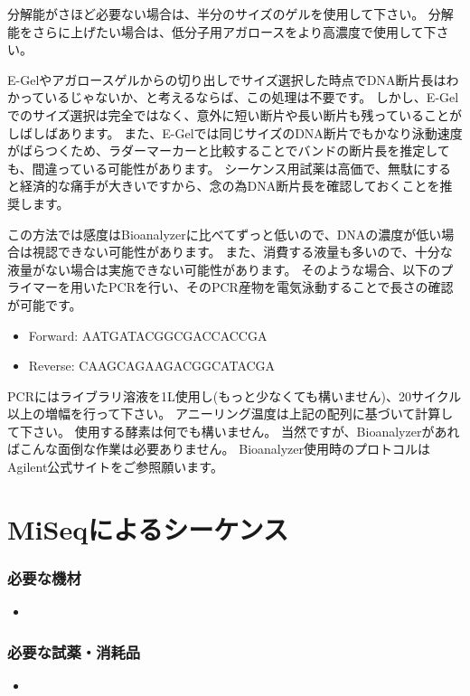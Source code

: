\documentclass[titlepage,10pt,a4paper,uplatex]{jsbook}
\begin{document}
分解能がさほど必要ない場合は、半分のサイズのゲルを使用して下さい。
分解能をさらに上げたい場合は、低分子用アガロースをより高濃度で使用して下さい。

E-Gelやアガロースゲルからの切り出しでサイズ選択した時点でDNA断片長はわかっているじゃないか、と考えるならば、この処理は不要です。
しかし、E-Gelでのサイズ選択は完全ではなく、意外に短い断片や長い断片も残っていることがしばしばあります。
また、E-Gelでは同じサイズのDNA断片でもかなり泳動速度がばらつくため、ラダーマーカーと比較することでバンドの断片長を推定しても、間違っている可能性があります。
シーケンス用試薬は高価で、無駄にすると経済的な痛手が大きいですから、念の為DNA断片長を確認しておくことを推奨します。

この方法では感度はBioanalyzerに比べてずっと低いので、DNAの濃度が低い場合は視認できない可能性があります。
また、消費する液量も多いので、十分な液量がない場合は実施できない可能性があります。
そのような場合、以下のプライマーを用いたPCRを行い、そのPCR産物を電気泳動することで長さの確認が可能です。

\begin{itemize}
\item Forward: AATGATACGGCGACCACCGA
\item Reverse: CAAGCAGAAGACGGCATACGA
\end{itemize}

PCRにはライブラリ溶液を1{\textmu}L使用し(もっと少なくても構いません)、20サイクル以上の増幅を行って下さい。
アニーリング温度は上記の配列に基づいて計算して下さい。
使用する酵素は何でも構いません。
当然ですが、Bioanalyzerがあればこんな面倒な作業は必要ありません。
Bioanalyzer使用時のプロトコルはAgilent公式サイトをご参照願います。

\section{MiSeqによるシーケンス}

\subsubsection{必要な機材}
\begin{itemize}
\item 
\end{itemize}

\subsubsection{必要な試薬・消耗品}
\begin{itemize}
\item 
\end{itemize}
\end{document}
